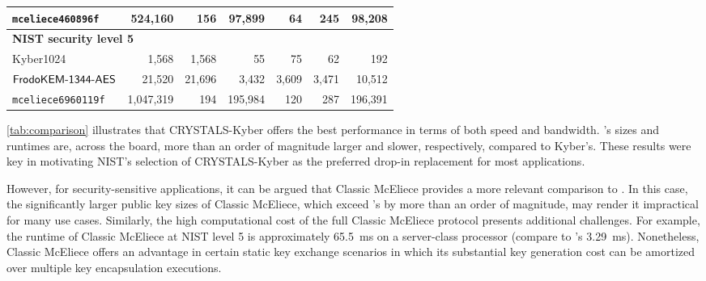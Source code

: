 \begin{table}[t]
\begin{tabular}{l|r r|r r r|r}
{\tt mceliece460896f}                &   524,160  &    156          &           97,899              &               64                   &                   245         &               98,208             \\
\midrule
\multicolumn{7}{l}{\bf NIST security level 5} \\
\midrule
Kyber1024                            &     1,568  &  1,568          &               55              &               75                   &                    62         &                  192             \\
$\textsf{\upshape\mdseries FrodoKEM-1344-AES}$                  &    21,520  & 21,696          &            3,432              &            3,609                   &                 3,471         &               10,512             \\
{\tt mceliece6960119f}               & 1,047,319  &    194          &          195,984              &              120                   &                   287         &              196,391             \\
\bottomrule
\end{tabular}
\end{table}
   

\autoref{tab:comparison} illustrates that CRYSTALS-Kyber offers the best performance in terms of both speed and bandwidth. 
\FrodoKEM's sizes and runtimes are, across the board, more than an order of magnitude larger and slower, respectively, compared to Kyber's.
These results were key in motivating NIST's selection of CRYSTALS-Kyber as the preferred drop-in replacement for most applications.

However, for security-sensitive applications, it can be argued that Classic McEliece provides a more relevant comparison to \FrodoKEM.
In this case, the significantly larger public key sizes of Classic McEliece, which exceed \FrodoKEM's by more than an order of magnitude,
may render it impractical for many use cases.
Similarly, the high computational cost of the full Classic McEliece protocol presents additional challenges.
For example, the runtime of Classic McEliece at NIST level 5 is approximately 65.5~ms on a server-class processor (compare to \FrodoKEM's 3.29~ms). 
Nonetheless, Classic McEliece offers an advantage in certain static key exchange scenarios in which its substantial key generation cost
can be amortized over multiple key encapsulation executions.



